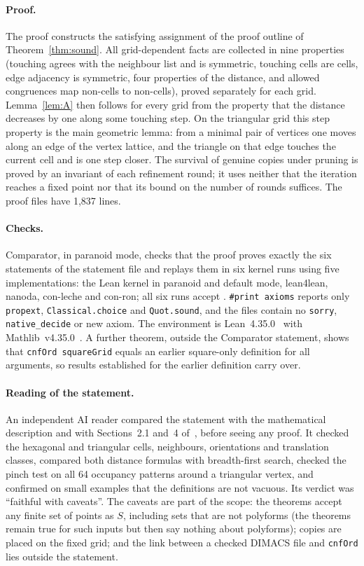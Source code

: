 \documentclass[10pt,a4paper]{article}
\theoremstyle{definition}
\theoremstyle{remark}
\newcommand{\lean}[1]{\texttt{#1}}
\begin{document}
\paragraph{Proof.}
The proof constructs the satisfying assignment of the proof outline of
Theorem~\ref{thm:sound}. All grid-dependent facts are collected in nine
properties (touching agrees with the neighbour list and is symmetric,
touching cells are cells, edge adjacency is symmetric, four properties of
the distance, and allowed congruences map non-cells to non-cells), proved
separately for each grid. Lemma~\ref{lem:A} then follows for every grid
from the property that the distance decreases by one along some touching
step. On the triangular grid this step property is the main geometric
lemma: from a minimal pair of vertices one moves along an edge of the
vertex lattice, and the triangle on that edge touches the current cell
and is one step closer. The survival of genuine copies under pruning is
proved by an invariant of each refinement round; it uses neither that the
iteration reaches a fixed point nor that its bound on the number of
rounds suffices. The proof files have 1,837 lines.

\paragraph{Checks.}
Comparator, in paranoid mode, checks that the proof proves exactly the
six statements of the statement file and replays them in six kernel runs
using five implementations: the Lean kernel in paranoid and default mode,
lean4lean, nanoda, con-leche and con-ron; all six runs accept
\cite{Comparator,Lean4Lean,OtherKernels}. \lean{\#print axioms} reports only
\lean{propext}, \lean{Classical.choice} and \lean{Quot.sound}, and the
files contain no \lean{sorry}, \lean{native\_decide} or new axiom. The
environment is Lean~4.35.0~\cite{Lean4} with Mathlib~v4.35.0~\cite{Mathlib}. A further theorem,
outside the Comparator statement, shows that \lean{cnfOrd squareGrid}
equals an earlier square-only definition for all arguments, so results
established for the earlier definition carry over.

\paragraph{Reading of the statement.}
An independent AI reader compared the statement with the mathematical
description and with Sections~2.1 and~4 of~\cite{Kaplan}, before seeing
any proof. It checked the hexagonal and triangular cells, neighbours,
orientations and translation classes, compared both distance formulas
with breadth-first search, checked the pinch test on all 64 occupancy
patterns around a triangular vertex, and confirmed on small examples that
the definitions are not vacuous. Its verdict was ``faithful with
caveats''. The caveats are part of the scope: the theorems accept any
finite set of points as $S$, including sets that are not polyforms (the
theorems remain true for such inputs but then say nothing about
polyforms); copies are placed on the fixed grid; and the link between a
checked DIMACS file and \lean{cnfOrd} lies outside the statement.
\end{document}
